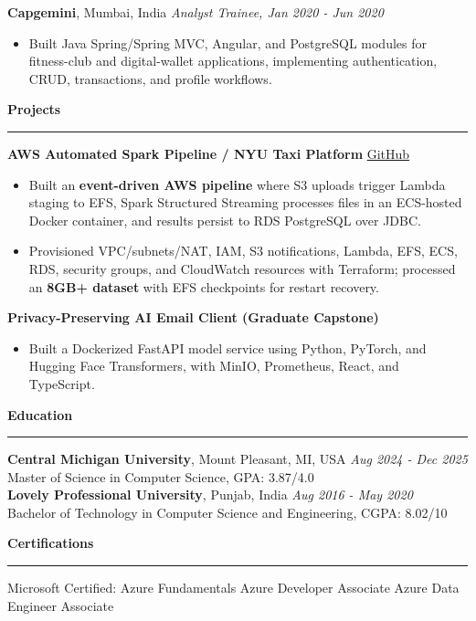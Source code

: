 \documentclass[11pt,letterpaper]{article}
\newcommand{\ressection}[1]{\Needspace{5\baselineskip}\vspace{8pt}\par\textbf{#1}\par\vspace{2pt}\hrule\vspace{5pt}}
\begin{document}
\textbf{Capgemini}, Mumbai, India \hfill \textit{Analyst Trainee, Jan 2020 - Jun 2020}
\begin{itemize}
  \item Built Java Spring/Spring MVC, Angular, and PostgreSQL modules for fitness-club and digital-wallet applications, implementing authentication, CRUD, transactions, and profile workflows.
\end{itemize}

\ressection{Projects}
\textbf{AWS Automated Spark Pipeline / NYU Taxi Platform} \hfill \href{https://github.com/preferablehuman/AWS-automated-spark-pipeline}{GitHub}
\begin{itemize}
  \item Built an \textbf{event-driven AWS pipeline} where S3 uploads trigger Lambda staging to EFS, Spark Structured Streaming processes files in an ECS-hosted Docker container, and results persist to RDS PostgreSQL over JDBC.
  \item Provisioned VPC/subnets/NAT, IAM, S3 notifications, Lambda, EFS, ECS, RDS, security groups, and CloudWatch resources with Terraform; processed an \textbf{8GB+ dataset} with EFS checkpoints for restart recovery.
\end{itemize}
\vspace{3pt}\par
\textbf{Privacy-Preserving AI Email Client (Graduate Capstone)}
\begin{itemize}
  \item Built a Dockerized FastAPI model service using Python, PyTorch, and Hugging Face Transformers, with MinIO, Prometheus, React, and TypeScript.
\end{itemize}

\ressection{Education}
\textbf{Central Michigan University}, Mount Pleasant, MI, USA \hfill \textit{Aug 2024 - Dec 2025}\\
Master of Science in Computer Science, GPA: 3.87/4.0\\[3pt]
\textbf{Lovely Professional University}, Punjab, India \hfill \textit{Aug 2016 - May 2020}\\
Bachelor of Technology in Computer Science and Engineering, CGPA: 8.02/10

\ressection{Certifications}
Microsoft Certified: Azure Fundamentals \textbar{} Azure Developer Associate \textbar{} Azure Data Engineer Associate
\end{document}
